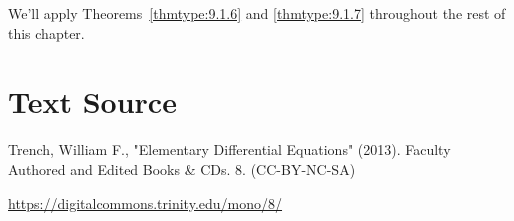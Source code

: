 \documentclass{ximera}
\begin{document}
We'll apply  Theorems~\ref{thmtype:9.1.6} and \ref{thmtype:9.1.7}
throughout the rest of this chapter.


\section*{Text Source}
Trench, William F., "Elementary Differential Equations" (2013). Faculty Authored and Edited Books \& CDs. 8. (CC-BY-NC-SA)

\href{https://digitalcommons.trinity.edu/mono/8/}{https://digitalcommons.trinity.edu/mono/8/}
\end{document}
